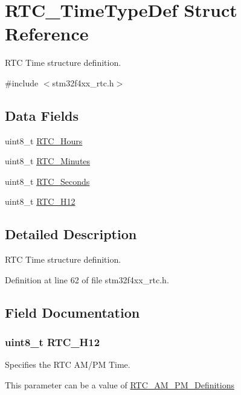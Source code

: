 \hypertarget{struct_r_t_c___time_type_def}{\section{R\-T\-C\-\_\-\-Time\-Type\-Def Struct Reference}
\label{struct_r_t_c___time_type_def}
}


R\-T\-C Time structure definition.  




{\ttfamily \#include $<$stm32f4xx\-\_\-rtc.\-h$>$}

\subsection*{Data Fields}
\begin{DoxyCompactItemize}
\item 
uint8\-\_\-t \hyperlink{struct_r_t_c___time_type_def_a477121009a567d6dd0e5fa1310574d32}{R\-T\-C\-\_\-\-Hours}
\item 
uint8\-\_\-t \hyperlink{struct_r_t_c___time_type_def_ae6454acb26dbaa987a4f39b992074394}{R\-T\-C\-\_\-\-Minutes}
\item 
uint8\-\_\-t \hyperlink{struct_r_t_c___time_type_def_a8c07c311d80e32ef93c46d5e5a701105}{R\-T\-C\-\_\-\-Seconds}
\item 
uint8\-\_\-t \hyperlink{struct_r_t_c___time_type_def_a0fe1916f490e9ef9fa171fbfcffd2c58}{R\-T\-C\-\_\-\-H12}
\end{DoxyCompactItemize}


\subsection{Detailed Description}
R\-T\-C Time structure definition. 

Definition at line 62 of file stm32f4xx\-\_\-rtc.\-h.



\subsection{Field Documentation}
\hypertarget{struct_r_t_c___time_type_def_a0fe1916f490e9ef9fa171fbfcffd2c58}{
\subsubsection[{R\-T\-C\-\_\-\-H12}]{\setlength{\rightskip}{0pt plus 5cm}uint8\-\_\-t R\-T\-C\-\_\-\-H12}}\label{struct_r_t_c___time_type_def_a0fe1916f490e9ef9fa171fbfcffd2c58}
\begin{DoxyVerb} Specifies the RTC AM/PM Time.
\end{DoxyVerb}
 This parameter can be a value of \hyperlink{group___r_t_c___a_m___p_m___definitions}{R\-T\-C\-\_\-\-A\-M\-\_\-\-P\-M\-\_\-\-Definitions} 

